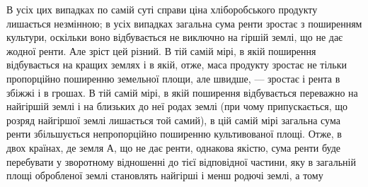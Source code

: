 В усіх цих випадках по самій суті справи ціна хліборобського продукту
лишається незмінною; в усіх випадках загальна сума ренти зростає з поширенням
культури, оскільки воно відбувається не виключно на гіршій землі, що
не дає жодної ренти. Але зріст цей різний. В тій самій мірі, в якій поширення
відбувається на кращих землях і в якій, отже, маса продукту зростає не тільки
пропорційно поширенню земельної площи, але швидше, — зростає і рента в
збіжжі і в грошах. В тій самій мірі, в якій поширення відбувається переважно
на найгіршій землі і на близьких до неї родах землі (при чому припускається,
що розряд найгіршої землі лишається той самий), в цій самій мірі загальна
сума ренти збільшується непропорційно поширенню культивованої площі. Отже,
в двох країнах, де земля $А$, що не дає ренти, однакова якістю, сума ренти
буде перебувати у зворотному відношенні до тієї відповідної частини, яку в загальній
площі обробленої землі становлять найгірші і менш родючі землі, а тому
\parbreak{}  %
